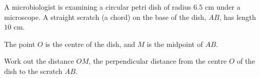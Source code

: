 \documentclass[11pt]{article}
\begin{document}
\begin{question}
\noindent A microbiologist is examining a circular petri dish of radius $6.5$ cm under a microscope. A straight scratch (a chord) on the base of the dish, $AB$, has length $10$ cm.

The point $O$ is the centre of the dish, and $M$ is the midpoint of $AB$.

\begin{center}
\end{center}

\noindent Work out the distance $OM$, the perpendicular distance from the centre $O$ of the dish to the scratch $AB$.

\vspace{4.5cm}
\begin{flushright}
\end{flushright}
\end{question}
\end{document}
